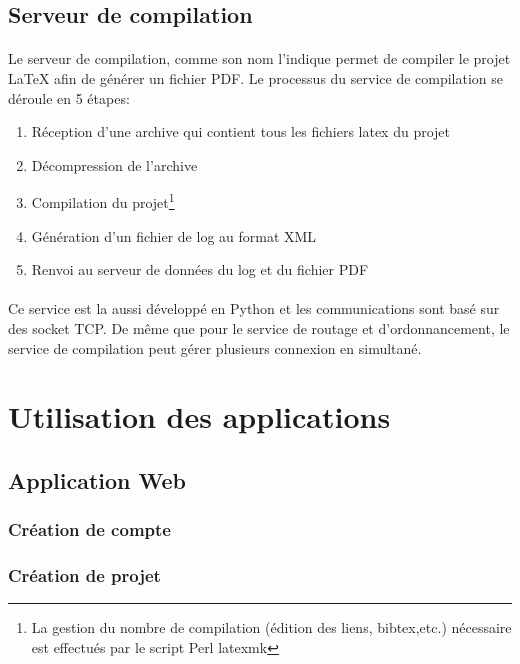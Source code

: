 \documentclass[a4paper,12pt]{article}
\begin{document}
\subsection{Serveur de compilation}
\paragraph*{}
Le serveur de compilation, comme son nom l'indique permet de compiler le projet LaTeX afin de générer un fichier PDF. Le processus du service de compilation se déroule en 5 étapes:
\begin{enumerate}
 \item Réception d'une archive qui contient tous les fichiers latex du projet
 \item Décompression de l'archive
 \item Compilation du projet\footnote{La gestion du nombre de compilation (édition des liens, bibtex,etc.) nécessaire est effectués par le script Perl latexmk}
 \item Génération d'un fichier de log au format XML
 \item Renvoi au serveur de données du log et du fichier PDF
\end{enumerate}

\paragraph{}
Ce service est la aussi développé en Python et les communications sont basé sur des socket TCP. De même que pour le service de routage et d'ordonnancement, le service de compilation peut gérer plusieurs connexion en simultané.


\newpage
\section{Utilisation des applications}
\subsection{Application Web}
\subsubsection{Création de compte}
\paragraph*{}

\subsubsection{Création de projet}
\end{document}
